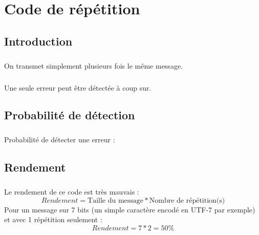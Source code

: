 
\chapter{Code de répétition}

    \section{Introduction}

        \paragraph{}
On transmet simplement plusieurs fois le même message.
        \paragraph{}
Une seule erreur peut être détectée à coup sur.


    \section{Probabilité de détection}

        \paragraph{}
Probabilité de détecter une erreur :


    \section{Rendement}

        \paragraph{}
Le rendement de ce code est très mauvais :
\[  Rendement = \text{Taille du message}*\text{Nombre de répétition(s)} \]
Pour un message sur 7 bits (un simple caractère encodé en UTF-7 par exemple) et avec 1 répétition seulement :
\[  Rendement = 7*2 = 50\% \]
